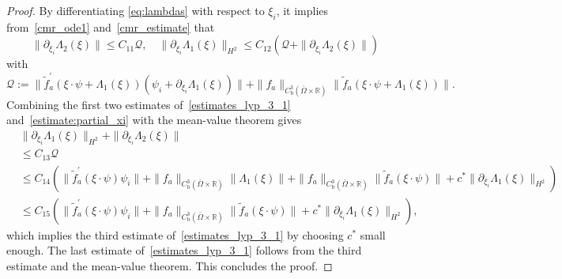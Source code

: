 \documentclass[10pt,a4paper]{amsart}
\begin{document}
\begin{proof}
By differentiating \eqref{eq:lambdas} with respect to $\xi_i$, it implies from~\eqref{cmr_ode1} and~\eqref{cmr_estimate} that
\begin{equation} \label{estimate:partial_xi}
	\|\partial_{\xi_i} \Lambda_2(\xi)\|\leqslant C_{11}\mathcal{Q}, \quad \|\partial_{\xi_i} \Lambda_1(\xi)\|_{H^2} \leqslant C_{12}\left( \mathcal{Q} + \|\partial_{\xi_i} \Lambda_2(\xi)\|\right)
\end{equation}
with
\begin{equation*}
	\mathcal{Q}:= \|\tilde{f}^{\prime}_a(\xi\cdot\psi + \Lambda_1(\xi))(\psi_i + \partial_{\xi_i}\Lambda_1(\xi))\| +\|f_a\|_{C^3_{\mathrm{b}}(\bar{\Omega}\times\mathbb{R})}\|\tilde{f}_a(\xi\cdot\psi + \Lambda_1(\xi))\|.
\end{equation*}
Combining the first two estimates of~\eqref{estimates_lyp_3_1} and~\eqref{estimate:partial_xi} with the mean-value theorem gives 
\begin{equation*}
\begin{split}
	&\|\partial_{\xi_i} \Lambda_1(\xi)\|_{H^2} + \|\partial_{\xi_i} \Lambda_2(\xi)\| \\
	&\leqslant C_{13}\mathcal{Q} \\
	&\leqslant C_{14}\left(\|\tilde{f}^{\prime}_a(\xi\cdot\psi)\psi_i \| + \|f_a\|_{C^3_{\mathrm{b}}(\bar{\Omega}\times\mathbb{R})}\|\Lambda_1(\xi)\| + \|f_a\|_{C^3_{\mathrm{b}}(\bar{\Omega}\times\mathbb{R})}\|\tilde{f}_a(\xi\cdot\psi)\| + c^\ast\|\partial_{\xi_i} \Lambda_1(\xi)\|_{H^2} \right)\\
	&\leqslant C_{15}\left(\|\tilde{f}^{\prime}_a(\xi\cdot\psi)\psi_i \| + \|f_a\|_{C^3_{\mathrm{b}}(\bar{\Omega}\times\mathbb{R})}\|\tilde{f}_a(\xi\cdot\psi)\| + c^\ast\|\partial_{\xi_i} \Lambda_1(\xi)\|_{H^2} \right),
\end{split}
\end{equation*}
which implies the third estimate of~\eqref{estimates_lyp_3_1} by choosing $c^\ast$ small enough. The last estimate of~\eqref{estimates_lyp_3_1} follows from the third estimate and the mean-value theorem. This concludes the proof.
\end{proof}
\end{document}
